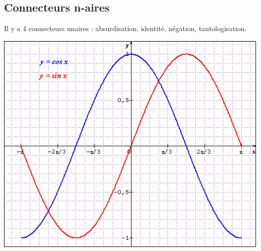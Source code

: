 \documentclass[a4paper,10pt]{book}
\begin{document}
\subsection{Connecteurs n-aires}
Il y a 4 connecteurs unaires : absurdisation, identité, négation, tautologisation.
\begin{center} \includegraphics[scale=0.45]{images/001.png} \end{center}
\end{document}
